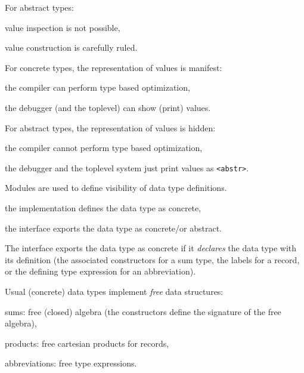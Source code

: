 For abstract types:

\begin{citemize}
\item value inspection is not possible,
\item value construction is carefully ruled.
\end{citemize}


For concrete types, the representation of values is manifest:

\begin{citemize}
\item the compiler can perform type based optimization,
\item the debugger (and the toplevel) can show (print) values.
\end{citemize}

For abstract types, the representation of values is hidden:
\begin{citemize}
\item the compiler cannot perform type based optimization,
\item the debugger and the toplevel system just print values as \verb"<abstr>".
\end{citemize}


Modules are used to define visibility of data type definitions.

\begin{citemize}
  \item the implementation defines the data type as concrete,
  \item the interface exports the data type as concrete/or abstract.
\end{citemize}

The interface exports the data type as concrete if it {\em declares} the data
type with its definition (the associated constructors for a sum type, the labels for
a record, or the defining type expression for an abbreviation).


Usual (concrete) data types implement {\em free} data structures:
\begin{citemize}
  \item sums: free (closed) algebra (the constructors define the
signature of the free algebra),
  \item products: free cartesian products for records,
  \item abbreviations: free type expressions.
\end{citemize}

